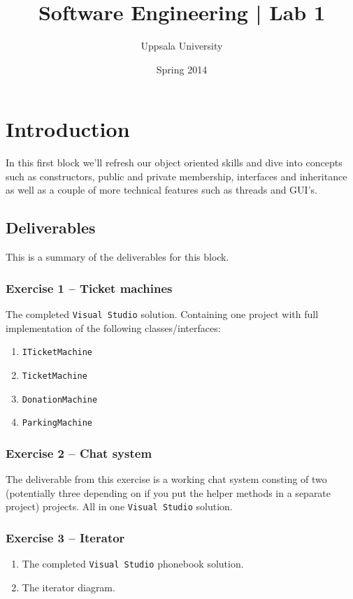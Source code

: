 \documentclass{article}
\begin{document}
  \title{ Software Engineering | Lab 1 }
  \author{ Uppsala University }
  \date{ Spring 2014 }
  \maketitle

  \lstset{language=[Sharp]C}







\section*{Introduction}
In this first block we’ll refresh our object oriented skills and dive into concepts such as constructors, public and private membership, interfaces and inheritance as well as a couple of more technical features such as threads and GUI’s.


\subsection*{Deliverables}
This is a summary of the deliverables for this block.

\subsubsection*{Exercise 1 -- Ticket machines}
The completed \texttt{Visual Studio} solution. Containing one project with full implementation of the following classes/interfaces:
\begin{enumerate}
  \item \texttt{ITicketMachine}
  \item \texttt{TicketMachine}
  \item \texttt{DonationMachine}
  \item \texttt{ParkingMachine}
\end{enumerate}

\subsubsection*{Exercise 2 -- Chat system}
The deliverable from this exercise is a working chat system consting of two (potentially three depending on if you put the helper methods in a separate project) projects. All in one \texttt{Visual Studio} solution.

\subsubsection*{Exercise 3 -- Iterator}
\begin{enumerate}
  \item The completed \texttt{Visual Studio} phonebook solution.
  \item The iterator diagram.
\end{enumerate}
\end{document}
